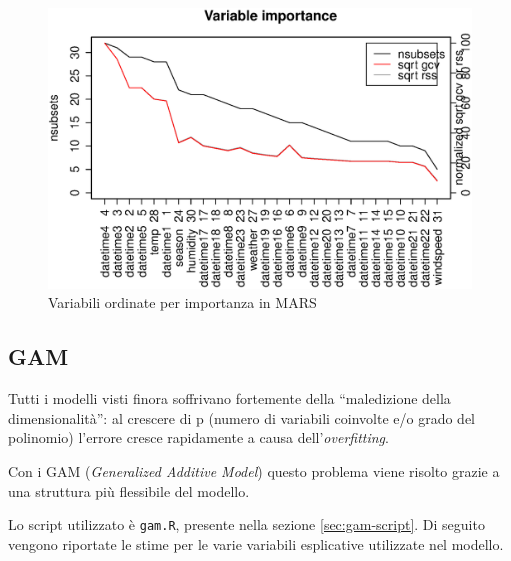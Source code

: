 \begin{figure}[H]
  \centering
  \includegraphics[width=.7\columnwidth]{images/non-linear/mars-variables.eps}
  \caption{Variabili ordinate per importanza in MARS}
  \label{fig:tree-2}
\end{figure}


\subsection{GAM}\label{sec:gam}
Tutti i modelli visti finora soffrivano fortemente della ``maledizione della
dimensionalità'': al crescere di p (numero di variabili coinvolte e/o grado del
polinomio) l'errore cresce rapidamente a causa dell'\emph{overfitting}.

Con i GAM (\emph{Generalized Additive Model}) questo problema viene risolto
grazie a una struttura più flessibile del modello.

Lo script utilizzato è \texttt{gam.R}, presente nella sezione
\ref{sec:gam-script}. Di seguito vengono riportate le stime per le varie
variabili esplicative utilizzate nel modello.

